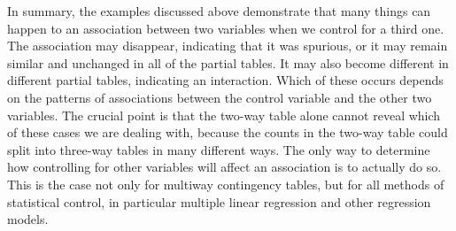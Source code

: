 In summary, the examples discussed above demonstrate that many things
can happen to an association between two variables when we control for a
third one. The association may disappear, indicating that it was
spurious, or it may remain similar and unchanged in all of the partial
tables. It may also become different in different partial tables,
indicating an interaction. Which of these occurs depends on the patterns
of associations between the control variable and the other two
variables. The crucial point is that the two-way table alone cannot
reveal which of these cases we are dealing with, because the counts in
the two-way table could split into three-way tables in many different
ways. The only way to determine how controlling for other variables will
affect an association is to actually do so. This is the case not only
for multiway contingency tables, but for all methods of statistical
control, in particular multiple linear regression and other regression models.

